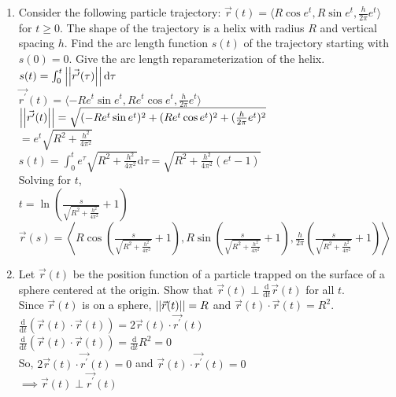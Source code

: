 \begin{enumerate}
	\item Consider the following particle trajectory: $\vec{r}(t) = \langle R\cos{e^t}, R\sin{e^t}, \frac{h}{2\pi}e^t \rangle$ for $t \geq 0$. The shape of the trajectory is a helix with radius $R$ and vertical spacing $h$. Find the arc length function $s(t)$ of the trajectory starting with $s(0) = 0$. Give the arc length reparameterization of the helix.\\
	\indent
	$s(t) = \int_{0}^{t}{\left|\left|\vec{r^\prime}(\tau)\right|\right|\mathrm{d}\tau}$\\
	$\vec{r^\prime}(t) = \langle -Re^{t}\sin{e^t}, Re^{t}\cos{e^t}, \frac{h}{2\pi}e^{t} \rangle$\\
	$\left|\left|\vec{r^\prime}(t)\right|\right| = \sqrt{(-Re^{t}\sin{e^t})^2 + (Re^{t}\cos{e^t})^2 + (\frac{h}{2\pi}e^t)^2}$\\
	$= e^{t}\sqrt{R^2 + \frac{h^2}{4\pi^2}}$\\
	$s(t) = \int_{0}^{t}{e^{\tau}\sqrt{R^2 + \frac{h^2}{4\pi^2}}\mathrm{d}\tau} = \sqrt{R^2 + \frac{h^2}{4\pi^2}(e^{t} - 1)}$\\
	Solving for $t$,\\
	$t = \ln{\left(\frac{s}{\sqrt{R^2 + \frac{h^2}{4\pi^2}}} + 1\right)}$\\
	$\vec{r}(s) = \left< R\cos{\left(\frac{s}{\sqrt{R^2 + \frac{h^2}{4\pi^2}}} + 1\right)}, R\sin{\left(\frac{s}{\sqrt{R^2 + \frac{h^2}{4\pi^2}}} + 1\right)}, \frac{h}{2\pi}\left(\frac{s}{\sqrt{R^2 +\frac{h^2}{4\pi^2}}} + 1\right) \right>$\\
	
	\item Let $\vec{r}(t)$ be the position function of a particle trapped on the surface of a sphere centered at the origin. Show that $\vec{r}(t)\perp\frac{\mathrm{d}}{\mathrm{d}t}\vec{r}(t)$ for all $t$.\\
	\indent
	Since $\vec{r}(t)$ is on a sphere, $\left|\left|\vec{r}(t)\right|\right| = R$ and $\vec{r}(t) \cdot \vec{r}(t) = R^2$.\\
	$\frac{\mathrm{d}}{\mathrm{d}t}(\vec{r}(t) \cdot \vec{r}(t)) = 2\vec{r}(t) \cdot \vec{r^\prime}(t)$\\
	$\frac{\mathrm{d}}{\mathrm{d}t}(\vec{r}(t) \cdot \vec{r}(t)) = \frac{\mathrm{d}}{\mathrm{d}t}R^2 = 0$\\
	So, $2\vec{r}(t) \cdot \vec{r^\prime}(t) = 0$ and $\vec{r}(t) \cdot \vec{r^\prime}(t) = 0$\\
	$\implies \vec{r}(t)\perp\vec{r^\prime}(t)$\\
\end{enumerate}